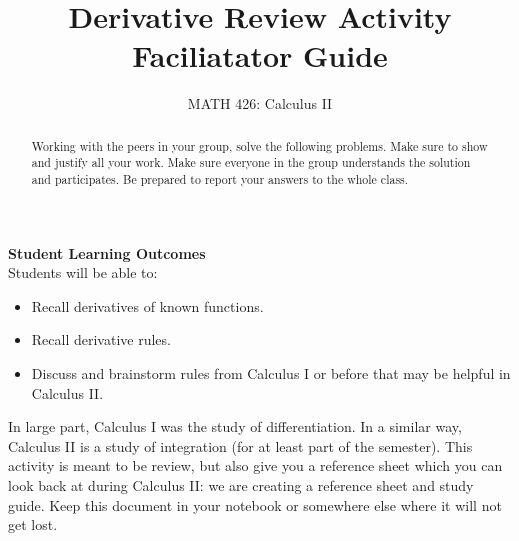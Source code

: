 \documentclass{ximera}
\title{Derivative Review Activity Faciliatator Guide}
\author{MATH 426: Calculus II}
\begin{document}
\begin{abstract}
   Working with the peers in your group, solve the following problems. Make sure to show and justify all your work. Make sure everyone in the group understands the solution and participates. Be prepared to report your answers to the whole class. 
\end{abstract}
\maketitle

\textbf{Student Learning Outcomes}\\
Students will be able to:
    \begin{itemize}
        \item Recall derivatives of known functions.
        \item Recall derivative rules.
        \item Discuss and brainstorm rules from Calculus I or before that may be helpful in Calculus II.
    \end{itemize}

In large part, Calculus I was the study of differentiation.  In a similar way, Calculus II is a study of integration (for at least part of the semester).  This activity is meant to be review, but also give you a reference sheet which you can look back at during Calculus II: we are creating a reference sheet and study guide.  Keep this document in your notebook or somewhere else where it will not get lost.
\end{document}
